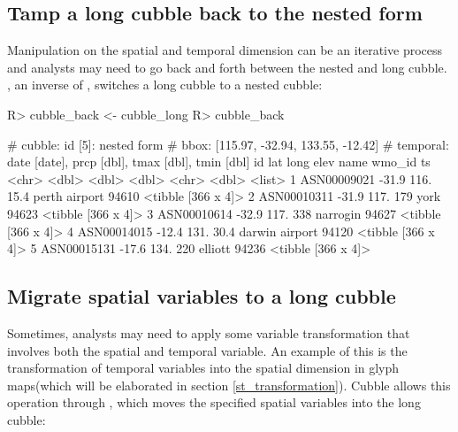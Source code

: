 \documentclass[
]{jss}
\begin{document}
\hypertarget{tamp-a-long-cubble-back-to-the-nested-form}{%
\subsection{Tamp a long cubble back to the nested
form}\label{tamp-a-long-cubble-back-to-the-nested-form}}

Manipulation on the spatial and temporal dimension can be an iterative
process and analysts may need to go back and forth between the nested
and long cubble. , an inverse of , switches
a long cubble to a nested cubble:

\begin{CodeChunk}
\begin{CodeInput}
R> cubble_back <- cubble_long %
R> cubble_back
\end{CodeInput}
\begin{CodeOutput}
# cubble:   id [5]: nested form
# bbox:     [115.97, -32.94, 133.55, -12.42]
# temporal: date [date], prcp [dbl], tmax [dbl], tmin [dbl]
  id            lat  long  elev name           wmo_id ts                
  <chr>       <dbl> <dbl> <dbl> <chr>           <dbl> <list>            
1 ASN00009021 -31.9  116.  15.4 perth airport   94610 <tibble [366 x 4]>
2 ASN00010311 -31.9  117. 179   york            94623 <tibble [366 x 4]>
3 ASN00010614 -32.9  117. 338   narrogin        94627 <tibble [366 x 4]>
4 ASN00014015 -12.4  131.  30.4 darwin airport  94120 <tibble [366 x 4]>
5 ASN00015131 -17.6  134. 220   elliott         94236 <tibble [366 x 4]>
\end{CodeOutput}
\end{CodeChunk}

\hypertarget{migrate-spatial-variables-to-a-long-cubble}{%
\subsection{Migrate spatial variables to a long
cubble}\label{migrate-spatial-variables-to-a-long-cubble}}

Sometimes, analysts may need to apply some variable transformation that
involves both the spatial and temporal variable. An example of this is
the transformation of temporal variables into the spatial dimension in
glyph maps(which will be elaborated in section \ref{st_transformation}).
Cubble allows this operation through , which moves the
specified spatial variables into the long cubble:
\end{document}
